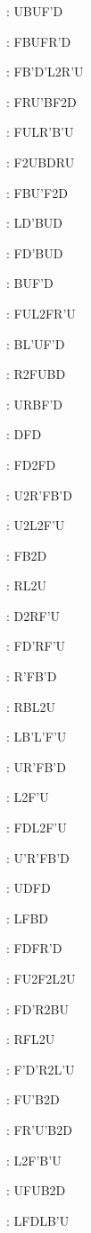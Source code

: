 \documentclass[9pt]{article}
\begin{document}
{\begin{multicols}{6}
: UBUF'D

: FBUFR'D

: FB'D'L2R'U

: FRU'BF2D

: FULR'B'U

: F2UBDRU

: FBU'F2D

: LD'BUD

: FD'BUD

: BUF'D

: FUL2FR'U

: BL'UF'D

: R2FUBD

: URBF'D

: DFD

: FD2FD

: U2R'FB'D

: U2L2F'U

: FB2D

: RL2U

: D2RF'U

: FD'RF'U

: R'FB'D

: RBL2U

: LB'L'F'U

: UR'FB'D

: L2F'U

: FDL2F'U

: U'R'FB'D

: UDFD

: LFBD

: FDFR'D

: FU2F2L2U

: FD'R2BU

: RFL2U

: F'D'R2L'U

: FU'B2D

: FR'U'B2D

: L2F'B'U

: UFUB2D

: LFDLB'U


\end{multicols}}
\end{document}
